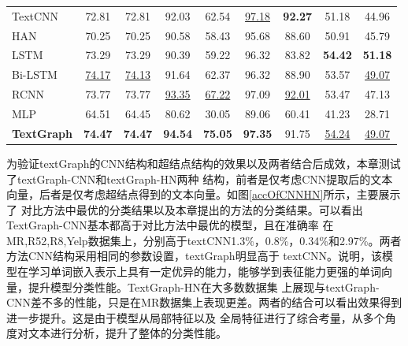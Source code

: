 \begin{table}[htb]
\begin{tabular}{lcccccccc}
    TextCNN                 & 72.81                   & 72.81                       & 92.03                   & 62.54                       & \underline{97.18}                   & \textbf{92.27}                       & 51.18                   & 44.96                        \\
    HAN                     & 70.25                   & 70.25                       & 90.58                   & 58.43                       & 95.68                   & 88.60                        & 50.91                   & 45.79                        \\
    LSTM                    & 73.29                   & 73.29                       & 90.39                   & 59.22                       & 96.32                   & 83.82                       & \textbf{54.42}                   & \textbf{51.18}                        \\
    Bi-LSTM                 & \underline{74.17}                   & \underline{74.13}                       & 91.64                   & 62.37                       & 96.32                   & 88.90                        & 53.57                   & \underline{49.07}                        \\
    RCNN                    & 73.77                   & 73.77                       & \underline{93.35}                   & \underline{67.22}                       & 97.09                   & \underline{92.01}                       &  53.47    & 47.13         \\
    MLP                     & 64.51                   & 64.45                       & 80.62                   & 30.05                       & 89.06                   & 60.41                       &41.23     & 28.71         \\
    \textbf{TextGraph}                  & \textbf{74.47}                   & \textbf{74.47}                       & \textbf{94.54}                   & \textbf{75.05}                       & \textbf{97.35}                   & 91.75                       &\underline{54.24}                   & \underline{49.07}                        \\
    \hline
    \end{tabular}
    \end{table}

为验证textGraph的CNN结构和超结点结构的效果以及两者结合后成效，本章测试了textGraph-CNN和textGraph-HN两种
结构，前者是仅考虑CNN提取后的文本向量，后者是仅考虑超结点得到的文本向量。如图\ref{accOfCNNHN}所示，主要展示了
对比方法中最优的分类结果以及本章提出的方法的分类结果。可以看出TextGraph-CNN基本都高于对比方法中最优的模型，且在准确率
在MR,R52,R8,Yelp数据集上，分别高于textCNN1.3\%，0.8\%，0.34\%和2.97\%。两者方法CNN结构采用相同的参数设置，textGraph明显高于
textCNN。说明，该模型在学习单词嵌入表示上具有一定优异的能力，能够学到表征能力更强的单词向量，提升模型分类性能。TextGraph-HN在大多数数据集
上展现与textGraph-CNN差不多的性能，只是在MR数据集上表现更差。两者的结合可以看出效果得到进一步提升。这是由于模型从局部特征以及
全局特征进行了综合考量，从多个角度对文本进行分析，提升了整体的分类性能。

